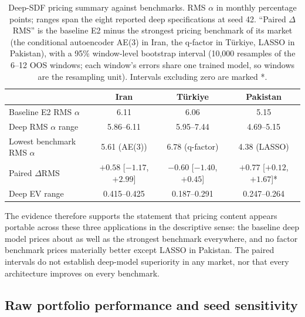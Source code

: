 \documentclass[12pt]{article}
\begin{document}
\begin{table}[htbp]
\centering
\caption{Deep-SDF pricing summary against benchmarks. RMS $\alpha$ in monthly percentage points; ranges span the eight reported deep specifications at seed 42. ``Paired $\Delta$RMS'' is the baseline E2 minus the strongest pricing benchmark of its market (the conditional autoencoder AE(3) in Iran, the q-factor in T\"urkiye, LASSO in Pakistan), with a 95\% window-level bootstrap interval (10,000 resamples of the 6--12 OOS windows; each window's errors share one trained model, so windows are the resampling unit). Intervals excluding zero are marked *.}
\label{tab:pricing}
\small
\setlength{\tabcolsep}{4pt}
\begin{tabular}{lccc}
\toprule
 & Iran & T\"urkiye & Pakistan \\
\midrule
Baseline E2 RMS $\alpha$ & 6.11 & 6.06 & 5.15 \\
Deep RMS $\alpha$ range & 5.86--6.11 & 5.95--7.44 & 4.69--5.15 \\
Lowest benchmark RMS $\alpha$ & 5.61 (AE(3)) & 6.78 (q-factor) & 4.38 (LASSO) \\
Paired $\Delta$RMS & $+0.58$ [$-1.17$, $+2.99$] & $-0.60$ [$-1.40$, $+0.45$] & $+0.77$ [$+0.12$, $+1.67$]* \\
Deep EV range & 0.415--0.425 & 0.187--0.291 & 0.247--0.264 \\
\bottomrule
\end{tabular}
\end{table}

The evidence therefore supports the statement that pricing content appears portable across these three applications in the descriptive sense: the baseline deep model prices about as well as the strongest benchmark everywhere, and no factor benchmark prices materially better except LASSO in Pakistan. The paired intervals do not establish deep-model superiority in any market, nor that every architecture improves on every benchmark.

\subsection{Raw portfolio performance and seed sensitivity}\label{sec:portfolio}
\end{document}
